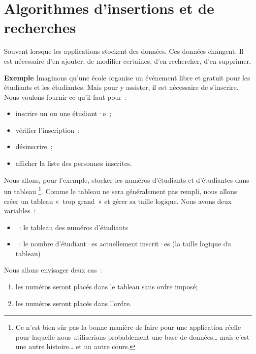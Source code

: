 \chapter{Algorithmes d'insertions et de recherches}
\label{chap:insertion-recherche}

	Souvent lorsque les applications stockent des données. Ces données changent. 
	Il est nécessaire d'en ajouter, de modifier certaines, d'en rechercher, d'en
	supprimer. 

	\minitoc
	\clearpage

	\textbf{Exemple}	Imaginons qu'une école organise un événement libre et
	gratuit pour les étudiants et les étudiantes.  Mais pour y assister, il est
	nécessaire de s’inscrire. Nous voulons fournir ce qu’il faut pour~:
	
	\begin{itemize}
	\item inscrire un ou une étudiant·e~;
	\item vérifier l'inscription~;
	\item désinscrire~;
	\item afficher la liste des personnes inscrites.
	\end{itemize}

	Nous allons, pour l'exemple, stocker les numéros d'étudiants et d'étudiantes
	dans un tableau%
	\footnote{%
		Ce n'est bien sûr pas la bonne manière de faire pour une application 
		réelle pour laquelle nous utiliserions probablement une base de données…
		mais c'est une autre histoire… et un autre cours. 
	}.
	Comme le tableau ne sera généralement pas rempli, nous allons créer un
	tableau «~trop grand~» et gérer sa taille logique.  Nous avons deux
	variables~:
	
	\begin{itemize}
	\item {}~: le tableau des numéros d’étudiants
	\item {}~: le nombre d’étudiant·es actuellement inscrit·es 
		(la taille logique du tableau)
	\end{itemize}
	
	Nous allons envisager deux cas~:
	\begin{enumerate}
	\item les numéros seront placés dans le tableau sans ordre imposé;
	\item les numéros seront placés dans l’ordre.		
	\end{enumerate}
	
